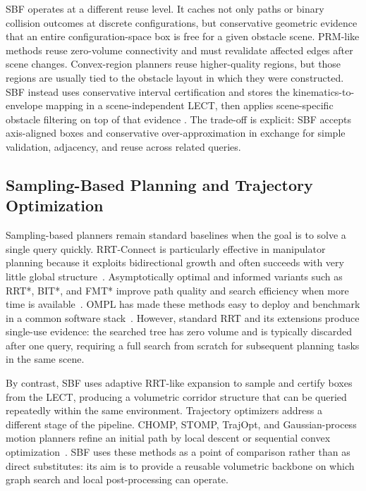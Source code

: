 \documentclass[journal]{IEEEtran}
\begin{document}
SBF operates at a different reuse level. It caches not only paths or binary
collision outcomes at discrete configurations, but conservative geometric
evidence that an entire configuration-space box is free for a given obstacle
scene. PRM-like methods reuse zero-volume connectivity and must revalidate
affected edges after scene changes. Convex-region planners reuse higher-quality
regions, but those regions are usually tied to the obstacle layout in which
they were constructed. SBF instead uses conservative interval certification and
stores the kinematics-to-envelope mapping in a scene-independent LECT, then
applies scene-specific obstacle filtering on top of that evidence
\cite{lozanoperez1983spatial,brooks1985subdivision}. The trade-off is explicit:
SBF accepts axis-aligned boxes and conservative over-approximation in exchange
for simple validation, adjacency, and reuse across related queries.

\subsection{Sampling-Based Planning and Trajectory Optimization}

Sampling-based planners remain standard baselines when the goal is to solve
a single query quickly. RRT-Connect is particularly effective in manipulator
planning because it exploits bidirectional growth and often succeeds with very
little global structure~\cite{kuffner2000rrt}. Asymptotically optimal and
informed variants such as RRT*, BIT*, and FMT* improve path quality and search
efficiency when more time is available~\cite{karaman2011sampling,
gammell2015batch,gammell2018informed,janson2015fmt}. OMPL has made these
methods easy to deploy and benchmark in a common software stack~\cite{sucan2012ompl,
moll2015benchmarking}. However, standard RRT and its extensions produce single-use
evidence: the searched tree has zero volume and is typically discarded after one
query, requiring a full search from scratch for subsequent planning tasks in
the same scene.

By contrast, SBF uses adaptive RRT-like expansion to sample and certify boxes
from the LECT, producing a volumetric corridor structure that can be queried
repeatedly within the same environment.
Trajectory optimizers address a different stage of the pipeline. CHOMP, STOMP,
TrajOpt, and Gaussian-process motion planners refine an initial path by local
descent or sequential convex optimization~\cite{ratliff2009chomp,
kalakrishnan2011stomp,schulman2014motion,mukadam2018gpmp2}. SBF uses these
methods as a point of comparison rather than as direct substitutes: its aim is
to provide a reusable volumetric backbone on which graph search and local
post-processing can operate.
\end{document}
